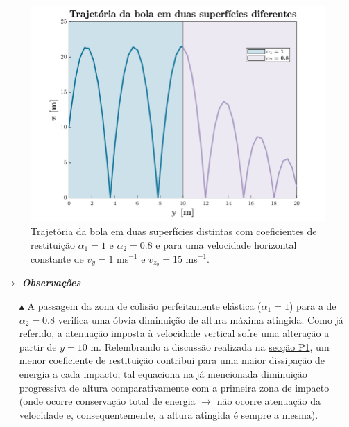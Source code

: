 \begin{figure}[H]
    \centering
    \includegraphics[width = 0.75\linewidth]{img/P3/P3-coefdif.png}
    \caption{Trajetória da bola em duas superfícies distintas com coeficientes de restituição $\alpha_1 = 1$ e $\alpha_2 = 0.8$ e para uma velocidade horizontal constante de $v_y = 1$ ms$^{-1}$ e $v_{z_0} = 15$ ms$^{-1}$.}
    \label{fig:2Pav}
\end{figure}

\noindent\textbf{\textit{$\rightarrow$ Observações}}
\vspace{-0.5em}
\begin{itemize}
    \item[$\blacktriangle$] A passagem da zona de colisão perfeitamente elástica ($\alpha_1 = 1$) para a de $\alpha_2 = 0.8$ verifica uma óbvia diminuição de altura máxima atingida. Como já referido, a atenuação imposta à velocidade vertical sofre uma alteração a partir de $y = 10$ m. Relembrando a discussão realizada na \hyperref[subsec:P1]{secção P1}, um menor coeficiente de restituição contribui para uma maior dissipação de energia a cada impacto, tal equaciona na já mencionada diminuição progressiva de altura comparativamente com a primeira zona de impacto (onde ocorre conservação total de energia $\rightarrow$ não ocorre atenuação da velocidade e, consequentemente, a altura atingida é sempre a mesma).
    
\end{itemize}
